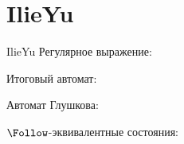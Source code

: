 \section{IlieYu}
\begin{frame}{IlieYu}
	Регулярное выражение:

	Итоговый автомат:


	Автомат Глушкова:


	$\Follow$-эквивалентные состояния:


\end{frame}


